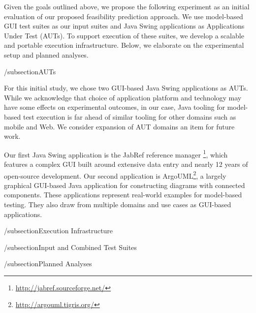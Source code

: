 Given the goals outlined above, we propose the following experiment as an
initial evaluation of our proposed feasibility prediction approach. We use
model-based GUI test suites as our input suites and Java Swing applications as
Applications Under Test (AUTs). To support execution of these suites, we
develop a scalable and portable execution infrastructure. Below, we elaborate
on the experimental setup and planned analyses.

/subsection{AUTs}

For this initial study, we chose two GUI-based Java Swing applications as
AUTs. While we acknowledge that choice of application platform and technology
may have some effects on experimental outcomes, in our case, Java tooling
for model-based test execution is far ahead of similar tooling for other
domains such as mobile and Web. We consider expansion of AUT domains an item
for future work.

Our first Java Swing application is the JabRef reference manager
\footnote{\url{http://jabref.sourceforge.net/}}, which features a complex
GUI built around extensive data entry and nearly 12 years of
open-source development. Our second application is
ArgoUML\footnote{\url{http://argouml.tigris.org/}}, a largely graphical
GUI-based Java application for constructing diagrams with connected
components. These applications represent real-world examples for model-based
testing. They also draw from multiple domains and use cases as GUI-based
applications.

/subsection{Execution Infrastructure}

/subsection{Input and Combined Test Suites}

/subsection{Planned Analyses}
